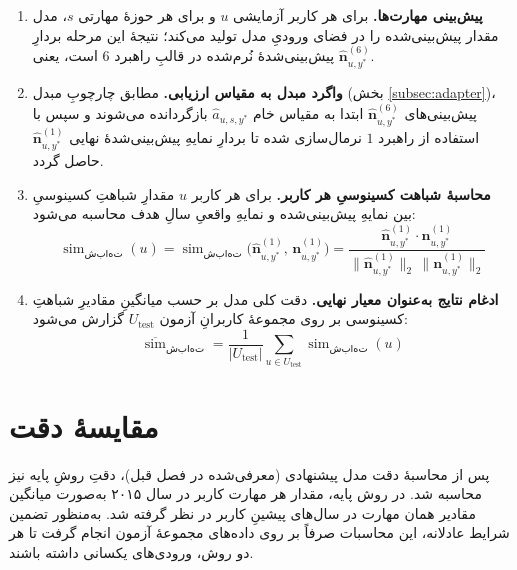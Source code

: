 \begin{enumerate}
  \item \textbf{پیش‌بینی مهارت‌ها.} برای هر کاربر آزمایشی \(u\) و برای هر حوزهٔ مهارتی \(s\)، مدل مقدار پیش‌بینی‌شده را در فضای ورودیِ مدل تولید می‌کند؛ نتیجهٔ این مرحله بردارِ پیش‌بینی‌شدهٔ نُرم‌شده در قالبِ راهبرد \(6\) است، یعنی \(\widehat{\mathbf{n}}^{(6)}_{u,y^*}\).  
  \item \textbf{واگرد مبدل به مقیاس ارزیابی.} مطابق چارچوبِ مبدل (بخش \ref{subsec:adapter})، پیش‌بینی‌های \(\widehat{\mathbf{n}}^{(6)}_{u,y^*}\) ابتدا به مقیاس خام \(\widehat{a}_{u,s,y^*}\) بازگردانده می‌شوند و سپس با استفاده از راهبرد \(1\) نرمال‌سازی شده تا بردارِ نمایهِ پیش‌بینی‌شدهٔ نهایی \(\widehat{\mathbf{n}}^{(1)}_{u,y^*}\) حاصل گردد.
  \item \textbf{محاسبهٔ شباهت کسینوسیِ هر کاربر.} برای هر کاربر \(u\) مقدارِ شباهتِ کسینوسیِ بین نمایهِ پیش‌بینی‌شده و نمایهِ واقعیِ سالِ هدف محاسبه می‌شود:
  \begin{equation}
   \operatorname{sim}_{\mathrm{شباهت}}(u) = \operatorname{sim}_{\mathrm{شباهت}}\bigl(\widehat{\mathbf{n}}^{(1)}_{u,y^*},\,\mathbf{n}^{(1)}_{u,y^*}\bigr) = \frac{\widehat{\mathbf{n}}^{(1)}_{u,y^*} \cdot \mathbf{n}^{(1)}_{u,y^*}}{\|\widehat{\mathbf{n}}^{(1)}_{u,y^*}\|_2 \, \|\mathbf{n}^{(1)}_{u,y^*}\|_2}
   \label{eq:cos_sim_user}
   \end{equation}
  \item \textbf{ادغام نتایج به‌عنوان معیار نهایی.} دقت کلی مدل بر حسب میانگینِ مقادیرِ شباهتِ کسینوسی بر روی مجموعهٔ کاربرانِ آزمون \(U_{\mathrm{test}}\) گزارش می‌شود:
  \begin{equation}
   \overline{\operatorname{sim}}_{\mathrm{شباهت}} = \frac{1}{\lvert U_{\mathrm{test}}\rvert} \sum_{u \in U_{\mathrm{test}}} \operatorname{sim}_{\mathrm{شباهت}}(u)
   \label{eq:avg_cos_sim}
   \end{equation}
\end{enumerate}

\section{مقایسهٔ دقت}
\label{sec:accuracy-comparison}

پس از محاسبهٔ دقت مدل پیشنهادی (معرفی‌شده در فصل قبل)، دقتِ روشِ پایه نیز محاسبه شد. در روش پایه، مقدار هر مهارت کاربر در سال ۲۰۱۵ به‌صورت میانگین مقادیر همان مهارت در سال‌های پیشینِ کاربر در نظر گرفته شد. به‌منظور تضمین شرایط عادلانه، این محاسبات صرفاً بر روی داده‌های مجموعهٔ آزمون انجام گرفت تا هر دو روش، ورودی‌های یکسانی داشته باشند.  

